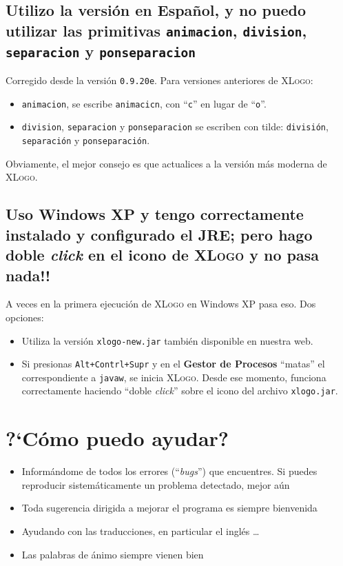 \subsection*{Utilizo la versi\'on en Espa\~nol, y no puedo utilizar las
            primitivas \texttt{animacion}, \texttt{division}, 
            \texttt{separacion} y \texttt{ponseparacion}
    \label{Primitivas-Espanol-Errores}}

Corregido desde la versi\'on \texttt{0.9.20e}. Para versiones anteriores
de \textsc{XLogo}:
\begin{itemize}
   \item \texttt{animacion}, se escribe \texttt{animacicn}, con
      ``\texttt{c}'' en lugar de ``\texttt{o}''. 
   \item \texttt{division}, \texttt{separacion} y \texttt{ponseparacion} se
      escriben con tilde: \texttt{divisi\'on}, \texttt{separaci\'on} y
      \texttt{ponseparaci\'on}.
\end{itemize}
Obviamente, el mejor consejo es que actualices a la versi\'on m\'as moderna
de \textsc{XLogo}.

\subsection*{Uso Windows XP y tengo correctamente instalado y configurado el
    JRE; pero hago doble \textit{click} en el icono de \textsc{XLogo} y no pasa
    nada!!}
   \label{Problema-WinXP}

A veces en la primera ejecuci\'on de \textsc{XLogo} en Windows XP pasa eso. Dos
opciones:
\begin{itemize}
   \item Utiliza la versi\'on \texttt{xlogo-new.jar} tambi\'en disponible
      en nuestra web.
   \item Si presionas \texttt{Alt+Contrl+Supr} y en el \textbf{Gestor de
      Procesos} ``matas'' el correspondiente a \texttt{javaw},
      se inicia \textsc{XLogo}. Desde ese momento, funciona correctamente
      haciendo ``doble \textit{click}'' sobre el icono del
      archivo \texttt{xlogo.jar}. 
\end{itemize}

\section{?`C\'omo puedo ayudar?}
   \label{Como-ayudar?}

\begin{itemize}
   \item Inform\'andome de todos los errores (``\textit{bugs}'')
      que encuentres. Si puedes reproducir sistem\'aticamente un problema
      detectado, mejor a\'un
   \item Toda sugerencia dirigida a mejorar el programa es siempre bienvenida
   \item Ayudando con las traducciones, en particular el ingl\'es \ldots{}
   \item Las palabras de \'animo siempre vienen bien
\end{itemize}
